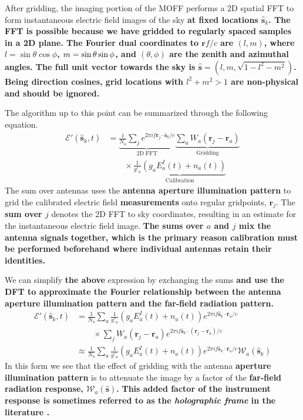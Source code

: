 \documentclass[a4paper,fleqn,usenatbib]{../mnras}
\newcommand{\Nant}{\ensuremath{N_{\mathrm{a}}}}
\newcommand{\s}{\ensuremath{\hat{\mathbf{s}}}} %
\newcommand{\ra}{\ensuremath{\mathbf{r}_a}}
\begin{document}
After gridding, the imaging portion of the MOFF performs a 2D spatial FFT to form 
instantaneous electric field images of the sky \textbf{at fixed locations $\s_k$.
The FFT is possible because we have gridded to regularly spaced samples in a 2D plane.
The Fourier dual coordinates to $\mathbf{r}f/c$ are $(l,m)$, where $l=\sin\theta\cos\phi$,
$m=\nobreak\sin\theta\sin\phi$, and $(\theta,\phi)$ are the zenith 
and azimuthal angles. The full unit vector towards the sky is 
$\s=(l,m,\sqrt{1-l^2-m^2})$.
Being direction cosines, grid locations with ${l^2+m^2>1}$ are non-physical and should
be ignored.}

The algorithm up to this point can be summarized 
through the following equation.
\begin{align}
\mathcal{E}'(\s_k,t) & = \underbrace{\frac{1}{\Nant} \sum_j e^{2\pi i f\mathbf{r}_j \cdot \s_k/c}}_{\mathrm{2D\;FFT}} 
\underbrace{\sum_a W_a(\mathbf{r}_j - \ra)}_{\mathrm{Gridding}} \\
& \qquad \times \underbrace{ \frac{1}{g'_a} \left(g_a E_a^I(t)+n_a(t)\right)}_{\mathrm{Calibration}} \nonumber
\end{align}
The sum over antennas uses the \textbf{antenna aperture illumination pattern} to grid the calibrated electric field \textbf{measurements} onto 
regular gridpoints, $\mathbf{r}_j$. The \textbf{sum over $j$} denotes the 2D FFT to sky coordinates, resulting in an 
estimate for the instantaneous electric field image. 
\textbf{The sums over $a$ and $j$ mix the antenna signals together, which is the primary 
reason calibration must be performed beforehand where individual antennas retain their 
identities.}

We can simplify \textbf{the above} expression by 
exchanging the sums \textbf{and use the DFT to approximate the Fourier relationship between
the antenna aperture illumination pattern and the far-field radiation pattern.}
\begin{align}\label{eq:epix}
\mathcal{E}'(\s_k,t) & = \frac{1}{\Nant} \sum_a \frac{1}{g'_a}\left(g_a E^I_a(t)+n_a(t)\right) e^{2\pi i f\s_k \cdot \ra/c} \nonumber \\
  & \qquad\times \sum_j W_a(\mathbf{r}_j-\ra)e^{2\pi i f\s_k \cdot (\mathbf{r}_j-\ra)/c} \nonumber\\
& \approx \frac{1}{\Nant} \sum_a \frac{1}{g'_a}\left(g_aE^I_a(t)+n_a(t)\right) e^{2\pi i f\s_k \cdot \ra/c}\mathcal{W}_a(\s_k)
\end{align}
In this form we see that the effect of gridding with the antenna \textbf{aperture illumination pattern} is to attenuate 
the image by a factor of the \textbf{far-field radiation response, $\mathcal{W}_a(\s)$.}
\textbf{This added factor of the instrument response is sometimes referred to as the
\emph{holographic frame} in the literature \citep[e.g.][]{mor09, sul12}.}
\end{document}
